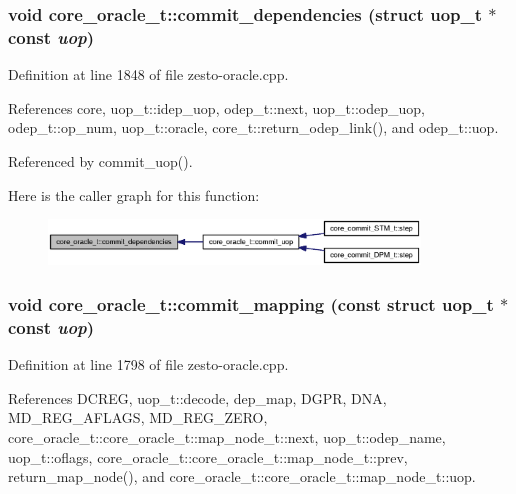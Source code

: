 \subsubsection[{commit\_\-dependencies}]{\setlength{\rightskip}{0pt plus 5cm}void core\_\-oracle\_\-t::commit\_\-dependencies (struct {\bf uop\_\-t} $\ast$const  {\em uop})\hspace{0.3cm}{\tt  [protected]}}\label{classcore__oracle__t_999bfe83c41ad19d351d0cfc5cc1b16a}




Definition at line 1848 of file zesto-oracle.cpp.

References core, uop\_\-t::idep\_\-uop, odep\_\-t::next, uop\_\-t::odep\_\-uop, odep\_\-t::op\_\-num, uop\_\-t::oracle, core\_\-t::return\_\-odep\_\-link(), and odep\_\-t::uop.

Referenced by commit\_\-uop().

Here is the caller graph for this function:\nopagebreak
\begin{figure}[H]
\begin{center}
\leavevmode
\includegraphics[width=280pt]{classcore__oracle__t_999bfe83c41ad19d351d0cfc5cc1b16a_icgraph}
\end{center}
\end{figure}
\subsubsection[{commit\_\-mapping}]{\setlength{\rightskip}{0pt plus 5cm}void core\_\-oracle\_\-t::commit\_\-mapping (const struct {\bf uop\_\-t} $\ast$const  {\em uop})\hspace{0.3cm}{\tt  [protected]}}\label{classcore__oracle__t_9c6462ead2fb5d7d4134ff11fc918029}




Definition at line 1798 of file zesto-oracle.cpp.

References DCREG, uop\_\-t::decode, dep\_\-map, DGPR, DNA, MD\_\-REG\_\-AFLAGS, MD\_\-REG\_\-ZERO, core\_\-oracle\_\-t::core\_\-oracle\_\-t::map\_\-node\_\-t::next, uop\_\-t::odep\_\-name, uop\_\-t::oflags, core\_\-oracle\_\-t::core\_\-oracle\_\-t::map\_\-node\_\-t::prev, return\_\-map\_\-node(), and core\_\-oracle\_\-t::core\_\-oracle\_\-t::map\_\-node\_\-t::uop.

